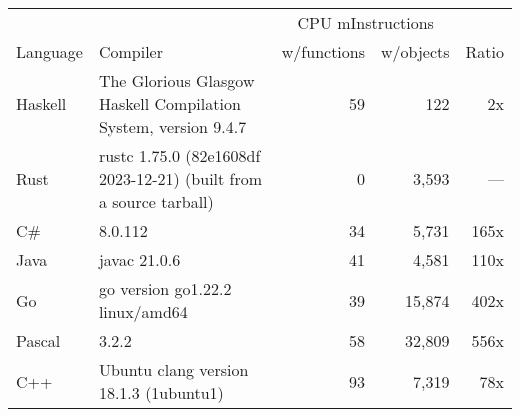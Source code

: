 \documentclass{article}
\begin{document}
      \begin{tabularx}{\linewidth}{lXrrr}
      \toprule
        & & \multicolumn{2}{c}{CPU mInstructions} & \\
        Language & Compiler & w/functions & w/objects & Ratio \\
      \midrule
    Haskell & The Glorious Glasgow Haskell Compilation System, version 9.4.7 & 59 & 122 & 2x \\
Rust & rustc 1.75.0 (82e1608df 2023-12-21) (built from a source tarball) & 0 & 3,593 & --- \\
C\# & 8.0.112 & 34 & 5,731 & 165x \\
Java & javac 21.0.6 & 41 & 4,581 & 110x \\
Go & go version go1.22.2 linux/amd64 & 39 & 15,874 & 402x \\
Pascal & 3.2.2 & 58 & 32,809 & 556x \\
C++ & Ubuntu clang version 18.1.3 (1ubuntu1) & 93 & 7,319 & 78x \\

      \bottomrule
      \end{tabularx}
      
\end{document}
